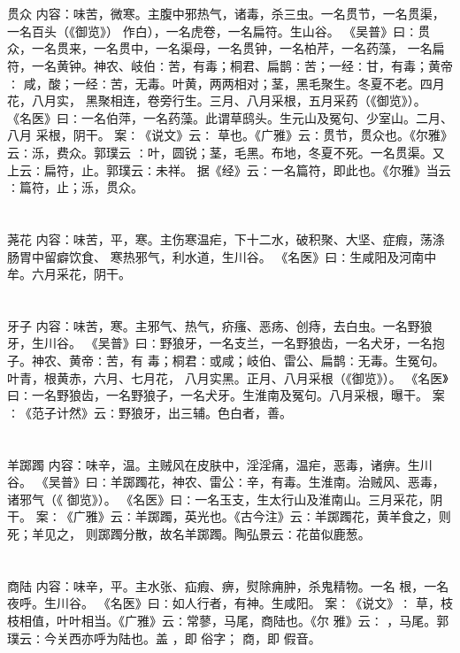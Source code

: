 \documentclass[12pt,UTF8]{ctexbook}
\begin{document}
\section{}贯众
内容：味苦，微寒。主腹中邪热气，诸毒，杀三虫。一名贯节，一名贯渠，一名百头（《御览》） 
作白），一名虎卷，一名扁符。生山谷。 
《吴普》曰∶贯众，一名贯来，一名贯中，一名渠母，一名贯钟，一名柏芹，一名药藻， 
一名扁符，一名黄钟。神农、岐伯∶苦，有毒；桐君、扁鹊∶苦；一经∶甘，有毒；黄帝∶ 
咸，酸；一经∶苦，无毒。叶黄，两两相对；茎，黑毛聚生。冬夏不老。四月花，八月实， 
黑聚相连，卷旁行生。三月、八月采根，五月采药（《御览》）。 
《名医》曰∶一名伯萍，一名药藻。此谓草鸱头。生元山及冤句、少室山。二月、八月 
采根，阴干。 
案∶《说文》云∶ 草也。《广雅》云∶贯节，贯众也。《尔雅》云∶泺，费众。郭璞云 
∶叶，圆锐；茎，毛黑。布地，冬夏不死。一名贯渠。又上云∶扁符，止。郭璞云∶未祥。 
据《经》云∶一名篇符，即此也。《尔雅》当云∶篇符，止；泺，贯众。 


\section{}荛花
内容：味苦，平，寒。主伤寒温疟，下十二水，破积聚、大坚、症瘕，荡涤肠胃中留癖饮食、 
寒热邪气，利水道，生川谷。 
《名医》曰∶生咸阳及河南中牟。六月采花，阴干。 


\section{}牙子
内容：味苦，寒。主邪气、热气，疥瘙、恶疡、创痔，去白虫。一名野狼牙，生川谷。 
《吴普》曰∶野狼牙，一名支兰，一名野狼齿，一名犬牙，一名抱子。神农、黄帝∶苦，有 
毒；桐君∶或咸；岐伯、雷公、扁鹊∶无毒。生冤句。叶青，根黄赤，六月、七月花， 
八月实黑。正月、八月采根（《御览》）。 
《名医》曰∶一名野狼齿，一名野狼子，一名犬牙。生淮南及冤句。八月采根，曝干。 
案∶《范子计然》云∶野狼牙，出三辅。色白者，善。 


\section{}羊踯躅
内容：味辛，温。主贼风在皮肤中，淫淫痛，温疟，恶毒，诸痹。生川谷。 
《吴普》曰∶羊踯躅花，神农、雷公∶辛，有毒。生淮南。治贼风、恶毒，诸邪气（《 
御览》）。 
《名医》曰∶一名玉支，生太行山及淮南山。三月采花，阴干。 
案∶《广雅》云∶羊踯躅，英光也。《古今注》云∶羊踯躅花，黄羊食之，则死；羊见之， 
则踯躅分散，故名羊踯躅。陶弘景云∶花苗似鹿葱。 


\section{}商陆
内容：味辛，平。主水张、疝瘕、痹，熨除痈肿，杀鬼精物。一名 根，一名夜呼。生川谷。 
《名医》曰∶如人行者，有神。生咸阳。 
案∶《说文》∶ 草，枝枝相值，叶叶相当。《广雅》云∶常蓼，马尾，商陆也。《尔 
雅》云∶ ，马尾。郭璞云∶今关西亦呼为陆也。盖 ，即 俗字； 
商，即 假音。 
\end{document}
